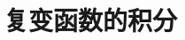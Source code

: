 \documentclass[12pt,handout]{ctexbeamer}
\begin{document}
\setcounter{part}{2}
\part{复变函数的积分}





\end{document}
